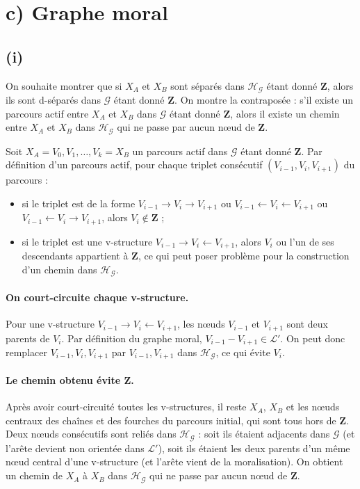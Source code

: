 \documentclass{article}
\begin{document}
\section*{c) Graphe moral}
 
\subsection*{(i)}
 
On souhaite montrer que si $X_A$ et $X_B$ sont séparés dans $\mathcal{H}_\mathcal{G}$ étant donné $\mathbf{Z}$, alors ils sont d-séparés dans $\mathcal{G}$ étant donné $\mathbf{Z}$. On montre la contraposée :
s'il existe un parcours actif entre $X_A$ et $X_B$ dans $\mathcal{G}$ étant donné $\mathbf{Z}$, alors il existe un chemin entre $X_A$ et $X_B$ dans $\mathcal{H}_\mathcal{G}$ qui ne passe par aucun n\oe ud de $\mathbf{Z}$.
 
Soit $X_A = V_0, V_1, \dots, V_k = X_B$ un parcours actif dans $\mathcal{G}$ étant donné $\mathbf{Z}$. Par définition d'un parcours actif, pour chaque triplet consécutif $(V_{i-1}, V_i, V_{i+1})$ du parcours :
\begin{itemize}
  \item si le triplet est de la forme $V_{i-1} \to V_i \to V_{i+1}$ ou $V_{i-1} \leftarrow V_i \leftarrow V_{i+1}$ ou $V_{i-1} \leftarrow V_i \to V_{i+1}$, alors $V_i \notin \mathbf{Z}$ ;
  \item si le triplet est une v-structure $V_{i-1} \to V_i \leftarrow V_{i+1}$, alors $V_i$ ou l'un de ses descendants appartient à $\mathbf{Z}$, ce qui peut poser problème pour la construction d'un chemin dans $\mathcal{H}_\mathcal{G}$.
\end{itemize}
 
\paragraph{On court-circuite chaque v-structure.}
Pour une v-structure $V_{i-1} \to V_i \leftarrow V_{i+1}$, les n\oe uds $V_{i-1}$ et $V_{i+1}$ sont deux parents de $V_i$. Par définition du graphe moral, $V_{i-1} - V_{i+1} \in \mathcal{L}'$. On peut donc remplacer $V_{i-1}, V_i, V_{i+1}$ par $V_{i-1}, V_{i+1}$ dans $\mathcal{H}_\mathcal{G}$, ce qui évite $V_i$.

\paragraph{Le chemin obtenu évite $\mathbf{Z}$.}
Après avoir court-circuité toutes les v-structures, il reste $X_A$, $X_B$ et les n\oe uds centraux des chaînes et des fourches du parcours initial, qui sont tous hors de $\mathbf{Z}$. Deux n\oe uds consécutifs sont reliés dans $\mathcal{H}_\mathcal{G}$ : soit ils étaient adjacents dans $\mathcal{G}$ (et l'arête devient non orientée dans $\mathcal{L}'$), soit ils étaient les deux parents d'un même n\oe ud central d'une v-structure (et l'arête vient de la moralisation). On obtient un chemin de $X_A$ à $X_B$ dans $\mathcal{H}_\mathcal{G}$ qui ne passe par aucun n\oe ud de $\mathbf{Z}$.
\end{document}
